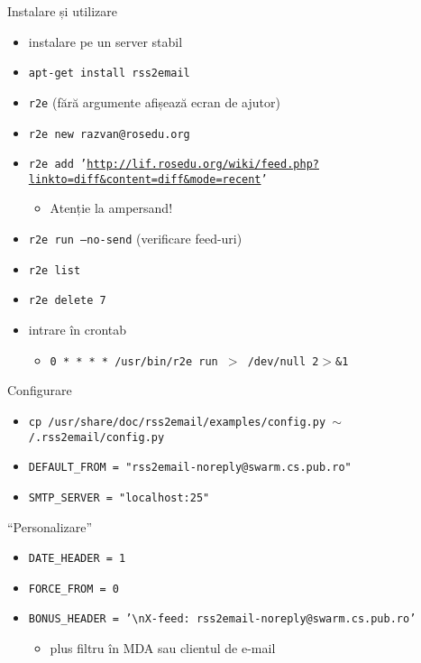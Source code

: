 \documentclass{simple}
\begin{document}
\begin{frame}{Instalare și utilizare}
  \begin{itemize}
    \item instalare pe un server stabil
    \item \texttt{apt-get install rss2email}
    \item \texttt{r2e} (fără argumente afișează ecran de ajutor)
    \item \texttt{r2e new razvan@rosedu.org}
    \item \texttt{r2e add
    '\url{http://lif.rosedu.org/wiki/feed.php?linkto=diff\&content=diff\&mode=recent}'}
      \begin{itemize}
        \item Atenție la ampersand!
      \end{itemize}
    \item \texttt{r2e run --no-send} (verificare feed-uri)
    \item \texttt{r2e list}
    \item \texttt{r2e delete 7}
    \item intrare în crontab
      \begin{itemize}
        \item \texttt{0 * * * * /usr/bin/r2e run $>$ /dev/null 2$>$\&1}
      \end{itemize}
  \end{itemize}
\end{frame}

\begin{frame}{Configurare}
  \begin{itemize}
    \item \texttt{cp /usr/share/doc/rss2email/examples/config.py
    $\sim$/.rss2email/config.py}
    \item \texttt{DEFAULT\_FROM = "rss2email-noreply@swarm.cs.pub.ro"}
    \item \texttt{SMTP\_SERVER = "localhost:25"}
  \end{itemize}
\end{frame}

\begin{frame}{``Personalizare''}
  \begin{itemize}
    \item \texttt{DATE\_HEADER = 1}
    \item \texttt{FORCE\_FROM = 0}
    \item \texttt{BONUS\_HEADER = '\textbackslash{}nX-feed:
    rss2email-noreply@swarm.cs.pub.ro'}
      \begin{itemize}
        \item plus filtru în MDA sau clientul de e-mail
      \end{itemize}
  \end{itemize}
\end{frame}
\end{document}
